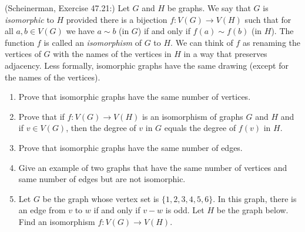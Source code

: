 \documentclass{article}
\theoremstyle{definition}
\begin{document}
\begin{question}
    (Scheinerman, Exercise 47.21:)
    Let  $G$ and $H$ be graphs.  We say that $G$ is \emph{isomorphic} to $H$
    provided there is a bijection $f \colon V(G) \to V(H)$ such that
    for all $a,b \in V(G)$ we have $a \sim b$ (in $G$) if and only if $f(a) \sim
    f(b)$ (in $H$).  The function $f$ is called an \emph{isomorphism} of $G$ to
    $H$.  We can think of $f$ as renaming the vertices of $G$ with the names of
    the vertices in $H$ in a way that preserves adjacency.  Less formally,
    isomorphic graphs have the same drawing (except for the names of the
    vertices).
    \begin{enumerate}
        \item Prove that isomorphic graphs have the same number of vertices.
        \item Prove that  if $f \colon V(G) \to V(H)$ is an
            isomorphism of graphs $G$ and $H$ and if $v \in V(G)$, then the
            degree of $v$ in $G$ equals the degree of $f(v)$ in $H$.
        \item Prove that isomorphic graphs have the same number of edges.
        \item Give an example of two graphs that have the same number of
            vertices and same number of edges but are not isomorphic.
        \item Let $G$ be the graph whose vertex set is $\{ 1,2,3,4,5,6\}$.  In
            this graph, there is an edge from $v$ to $w$ if and only if $v-w$ is
            odd.  Let $H$ be the graph below.  Find an
            isomorphism $f \colon V(G) \to V(H)$.
    \end{enumerate}
    \begin{center}
    \end{center}
\end{question}
\begin{solution}
\end{solution}
\end{document}

